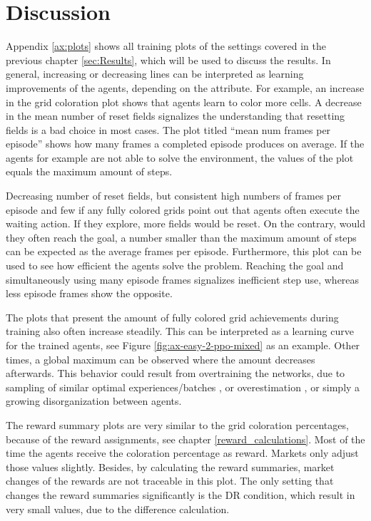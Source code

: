 \chapter{Discussion}\label{sec:Discussion}
Appendix \ref{ax:plots} shows all training plots of the settings covered in the previous chapter \ref{sec:Results}, which will be used to discuss the results. In general, increasing or decreasing lines can be interpreted as learning improvements of the agents, depending on the attribute. For example, an increase in the grid coloration plot shows that agents learn to color more cells. A decrease in the mean number of reset fields signalizes the understanding that resetting fields is a bad choice in most cases. The plot titled ``mean num frames per episode'' shows how many frames a completed episode produces on average. If the agents for example are not able to solve the environment, the values of the plot equals the maximum amount of steps. 

Decreasing number of reset fields, but consistent high numbers of frames per episode and few if any fully colored grids point out that agents often execute the waiting action. If they explore, more fields would be reset. On the contrary, would they often reach the goal, a number smaller than the maximum amount of steps can be expected as the average frames per episode. Furthermore, this plot can be used to see how efficient the agents solve the problem. Reaching the goal and simultaneously using many episode frames signalizes inefficient step use, whereas less episode frames show the opposite.

The plots that present the amount of fully colored grid achievements during training also often increase steadily. This can be interpreted as a learning curve for the trained agents, see Figure \ref{fig:ax-easy-2-ppo-mixed} as an example. Other times, a global maximum can be observed where the amount decreases afterwards. This behavior could result from overtraining the networks, due to sampling of similar optimal experiences/batches \cite{zhvi18}, or overestimation \cite{hemo18}, or simply a growing disorganization between agents.

The reward summary plots are very similar to the grid coloration percentages, because of the reward assignments, see chapter \ref{reward_calculations}. Most of the time the agents receive the coloration percentage as reward. Markets only adjust those values slightly. Besides, by calculating the reward summaries, market changes of the rewards are not traceable in this plot. The only setting that changes the reward summaries significantly is the DR condition, which result in very small values, due to the difference calculation.

